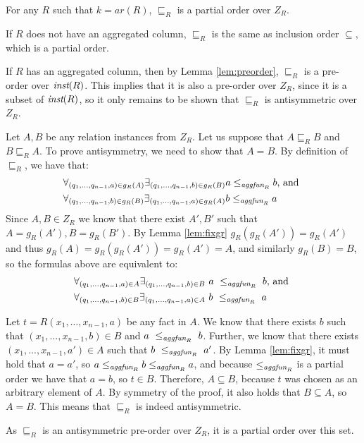 \begin{thm}
For any $R$ such that $k=ar(R)$, $\sqsubseteq_R$ is a partial order over $Z_R$.
\end{thm}
\begin{prof}
If $R$ does not have an aggregated column, $\sqsubseteq_R$ is the same as inclusion order $\subseteq$, which is a partial order.

If $R$ has an aggregated column, then by Lemma \ref{lem:preorder}, $\sqsubseteq_R$ is a pre-order over $\textit{inst}(R)$. This implies that it is also a pre-order over $Z_R$, since it is a subset of $\textit{inst}(R)$, so it only remains to be shown that $\sqsubseteq_R$ is antisymmetric over $Z_R$.

Let $A, B$ be any relation instances from $Z_R$. Let us suppose that $A \sqsubseteq_R B$ and $B \sqsubseteq_R A$. To prove antisymmetry, we need to show that $A = B$. By definition of $\sqsubseteq_R$, we have that:
\begin{align*}
\forall_{(q_1, ..., q_{n-1}, a) \in g_R(A)} \exists_{(q_1, ..., q_{n-1}, b) \in g_R(B)} a \le_{\textit{aggfun}_R} b & \text{, and } \\
\forall_{(q_1, ..., q_{n-1}, b) \in g_R(B)} \exists_{(q_1, ..., q_{n-1}, a) \in g_R(A)} b \le_{\textit{aggfun}_R} a &
\end{align*}
Since $A, B \in Z_R$ we know that there exist $A', B'$ such that $A = g_R(A'), B = g_R(B')$. By Lemma \ref{lem:fixgr} $g_R(g_R(A')) = g_R(A')$ and thus $g_R(A) = g_R(g_R(A')) = g_R(A') = A$, and similarly $g_R(B) = B$, so the formulas above are equivalent to:
\begin{align*}
\forall_{(q_1, ..., q_{n-1}, a) \in A} \exists_{(q_1, ..., q_{n-1}, b) \in B}~a~\le_{\textit{aggfun}_R}~b &\text{, and }  \\
\forall_{(q_1, ..., q_{n-1}, b) \in B} \exists_{(q_1, ..., q_{n-1}, a) \in A}~b~\le_{\textit{aggfun}_R}~a&
\end{align*}

Let $t = R(x_1, \dots, x_{n-1}, a)$ be any fact in $A$. We know that there exists $b$ such that $(x_1, ..., x_{n-1}, b) \in B$ and $a~\le_{\textit{aggfun}_R}~b$. Further, we know that there exists $(x_1, ..., x_{n-1}, a') \in A$ such that $b~\le_{\textit{aggfun}_R}~a'$. By Lemma \ref{lem:fixgr}, it must hold that $a = a'$, so $a \le_{\textit{aggfun}_R} b \le_{\textit{aggfun}_R} a$, and because $\le_{\textit{aggfun}_R}$ is a partial order we have that $a = b$, so $t \in B$. Therefore, $A \subseteq B$, because $t$ was chosen as an arbitrary element of $A$. By symmetry of the proof, it also holds that $B \subseteq A$, so $A = B$. This means that $\sqsubseteq_R$ is indeed antisymmetric.

As $\sqsubseteq_R$ is an antisymmetric pre-order over $Z_R$, it is a partial order over this set.
\end{prof}

